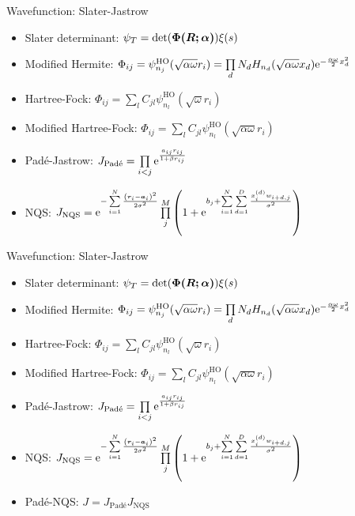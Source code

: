 \documentclass[10pt, t, xcolor=dvipsnames]{beamer}
\begin{document}
{{{{{\begin{frame}[fragile]{Wavefunction: Slater-Jastrow}
    \begin{itemize}
        \item Slater determinant: $\psi_T =
            \det(\blds{\Phi(\blds{R};\blds{\alpha})}) \xi(s)$
        \item Modified Hermite: $\Phi_{ij} =
            \psi^{\text{HO}}_{n_j}(\sqrt{\alpha\omega}r_i) = \prod\limits_d N_d
            H_{n_d}(\sqrt{\alpha \omega}x_d)\me^{-\frac{\alpha\omega}{2}x^2_d}$
        \item Hartree-Fock: $\Phi_{ij} =
            \sum\limits_lC_{jl}\psi^{\text{HO}}_{n_l}\left(\sqrt{\omega}r_i\right)$
        \item Modified Hartree-Fock: $\Phi_{ij} =
            \sum\limits_lC_{jl}\psi^{\text{HO}}_{n_l}\left(\sqrt{\alpha\omega}r_i\right)$
        \item Pad\'e-Jastrow: $J_{\text{Pad\'e}} = \prod\limits_{i<j}
            \me^{\frac{a_{ij} r_{ij}}{1 + \beta r_{ij}}}$
        \item NQS: $J_{\text{NQS}} = \me^{-\suml{i=1}{N} \frac{\left(\bm{r}_i -
            \bm{a}_i\right)^2}{2\sigma^2}}\prod\limits^{M}_j \left(1 + \me^{b_j
            + \suml{i=1}{N}\suml{d=1}{D}
            \frac{x^{(d)}_iw_{i+d,j}}{\sigma^2}}\right)$
    \end{itemize}
\end{frame}

\begin{frame}[fragile]{Wavefunction: Slater-Jastrow}
    \begin{itemize}
        \item Slater determinant: $\psi_T =
            \det(\blds{\Phi(\blds{R};\blds{\alpha})}) \xi(s)$
        \item Modified Hermite: $\Phi_{ij} =
            \psi^{\text{HO}}_{n_j}(\sqrt{\alpha\omega}r_i) = \prod\limits_d N_d
            H_{n_d}(\sqrt{\alpha \omega}x_d)\me^{-\frac{\alpha\omega}{2}x^2_d}$
        \item Hartree-Fock: $\Phi_{ij} =
            \sum\limits_lC_{jl}\psi^{\text{HO}}_{n_l}\left(\sqrt{\omega}r_i\right)$
        \item Modified Hartree-Fock: $\Phi_{ij} =
            \sum\limits_lC_{jl}\psi^{\text{HO}}_{n_l}\left(\sqrt{\alpha\omega}r_i\right)$
        \item Pad\'e-Jastrow: $J_{\text{Pad\'e}} = \prod\limits_{i<j}
            \me^{\frac{a_{ij} r_{ij}}{1 + \beta r_{ij}}}$
        \item NQS: $J_{\text{NQS}} = \me^{-\suml{i=1}{N} \frac{\left(\bm{r}_i -
            \bm{a}_i\right)^2}{2\sigma^2}}\prod\limits^{M}_j \left(1 + \me^{b_j
            + \suml{i=1}{N}\suml{d=1}{D}
            \frac{x^{(d)}_iw_{i+d,j}}{\sigma^2}}\right)$
        \item Pad\'e-NQS: $J = J_{\text{Pad\'e}}J_{\text{NQS}}$
    \end{itemize}
\end{frame}

}}}}}
\end{document}
